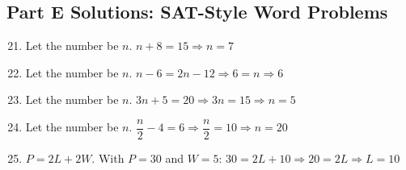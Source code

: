 \documentclass[14pt]{extarticle}
\begin{document}
\subsection*{Part E Solutions: SAT-Style Word Problems}
\begin{enumerate}
    \setcounter{enumi}{20}
    \item Let the number be \(n\). \(n + 8 = 15 \Rightarrow n = \boxed{7}\)
    \item Let the number be \(n\). \(n - 6 = 2n - 12 \Rightarrow 6 = n \Rightarrow \boxed{6}\)
    \item Let the number be \(n\). \(3n + 5 = 20 \Rightarrow 3n = 15 \Rightarrow n = \boxed{5}\)
    \item Let the number be \(n\). \(\dfrac{n}{2} - 4 = 6 \Rightarrow \dfrac{n}{2} = 10 \Rightarrow n = \boxed{20}\)
    \item \(P = 2L + 2W\). With \(P = 30\) and \(W = 5\): \(30 = 2L + 10 \Rightarrow 20 = 2L \Rightarrow L = \boxed{10}\)
\end{enumerate}




\end{document}
